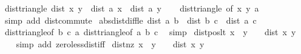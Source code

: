 \begin{isabellebody}
\endisatagproof
{\isafoldproof}%
%
\isadelimproof
\isanewline
%
\endisadelimproof
\isanewline
{}\isamarkupfalse%
\ dist{\isacharunderscore}{\kern0pt}triangle{}{\isacharcolon}{\kern0pt}\ {\isachardoublequoteopen}dist\ x\ y\ {\isasymle}\ dist\ a\ x\ {\isacharplus}{\kern0pt}\ dist\ a\ y{\isachardoublequoteclose}\isanewline
%
\isadelimproof
\ \ %
\endisadelimproof
%
\isatagproof
{}\isamarkupfalse%
\ dist{\isacharunderscore}{\kern0pt}triangle{}\ {\isacharbrackleft}{\kern0pt}of\ x\ y\ a{\isacharbrackright}{\kern0pt}\ \isamarkupfalse%
\ {\isacharparenleft}{\kern0pt}simp\ add{\isacharcolon}{\kern0pt}\ dist{\isacharunderscore}{\kern0pt}commute{\isacharparenright}{\kern0pt}%
\endisatagproof
{\isafoldproof}%
%
\isadelimproof
\isanewline
%
\endisadelimproof
\isanewline
{}\isamarkupfalse%
\ abs{\isacharunderscore}{\kern0pt}dist{\isacharunderscore}{\kern0pt}diff{\isacharunderscore}{\kern0pt}le{\isacharcolon}{\kern0pt}\ {\isachardoublequoteopen}{\isasymbar}dist\ a\ b\ {\isacharminus}{\kern0pt}\ dist\ b\ c{\isasymbar}\ {\isasymle}\ dist\ a\ c{\isachardoublequoteclose}\isanewline
%
\isadelimproof
\ \ %
\endisadelimproof
%
\isatagproof
{}\isamarkupfalse%
\ dist{\isacharunderscore}{\kern0pt}triangle{}{\isacharbrackleft}{\kern0pt}of\ b\ c\ a{\isacharbrackright}{\kern0pt}\ dist{\isacharunderscore}{\kern0pt}triangle{}{\isacharbrackleft}{\kern0pt}of\ a\ b\ c{\isacharbrackright}{\kern0pt}\ \isamarkupfalse%
\ simp%
\endisatagproof
{\isafoldproof}%
%
\isadelimproof
\isanewline
%
\endisadelimproof
\isanewline
{}\isamarkupfalse%
\ dist{\isacharunderscore}{\kern0pt}pos{\isacharunderscore}{\kern0pt}lt{\isacharcolon}{\kern0pt}\ {\isachardoublequoteopen}x\ {\isasymnoteq}\ y\ {\isasymLongrightarrow}\ {}\ {\isacharless}{\kern0pt}\ dist\ x\ y{\isachardoublequoteclose}\isanewline
%
\isadelimproof
\ \ %
\endisadelimproof
%
\isatagproof
{}\isamarkupfalse%
\ {\isacharparenleft}{\kern0pt}simp\ add{\isacharcolon}{\kern0pt}\ zero{\isacharunderscore}{\kern0pt}less{\isacharunderscore}{\kern0pt}dist{\isacharunderscore}{\kern0pt}iff{\isacharparenright}{\kern0pt}%
\endisatagproof
{\isafoldproof}%
%
\isadelimproof
\isanewline
%
\endisadelimproof
\isanewline
{}\isamarkupfalse%
\ dist{\isacharunderscore}{\kern0pt}nz{\isacharcolon}{\kern0pt}\ {\isachardoublequoteopen}x\ {\isasymnoteq}\ y\ {\isasymlongleftrightarrow}\ {}\ {\isacharless}{\kern0pt}\ dist\ x\ y{\isachardoublequoteclose}\isanewline
%
\isadelimproof

\end{isabellebody}
